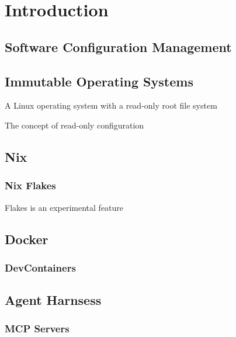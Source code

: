 \chapter{Introduction}\label{chap:intro}

\section{Software Configuration Management}

\section{Immutable Operating Systems}

A Linux operating system with a read-only root file system

The concept of read-only configuration

\section{Nix}

\subsection{Nix Flakes}

Flakes is an experimental feature



\section{Docker}

\subsection{DevContainers}

\section{Agent Harnsess}

\subsection{MCP Servers}


